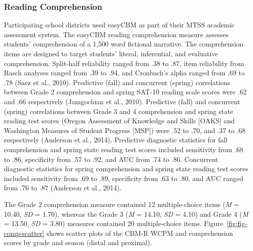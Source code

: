 \documentclass[
  english,
  man, fleqn, noextraspace]{apa6}
\begin{document}
\hypertarget{reading-comprehension}{%
\subsubsection{Reading Comprehension}\label{reading-comprehension}}

Participating school districts used easyCBM as part of their MTSS academic assessment system. The easyCBM reading comprehension measure assesses students' comprehension of a 1,500 word fictional narrative. The comprehension items are designed to target students' literal, inferential, and evaluative comprehension. Split-half reliability ranged from .38 to .87, item reliability from Rasch analyses ranged from .39 to .94, and Cronbach's alpha ranged from .69 to .78 (Saez et al., 2010). Predictive (fall) and concurrent (spring) correlations between Grade 2 comprehension and spring SAT-10 reading scale scores were .62 and .66 respectively (Jamgochian et al., 2010). Predictive (fall) and concurrent (spring) correlations between Grade 3 and 4 comprehension and spring state reading test scores (Oregon Assessment of Knowledge and Skills {[}OAKS{]} and Washington Measures of Student Progress {[}MSP{]}) were .52 to .70, and .37 to .68 respectively (Anderson et al., 2014). Predictive diagnostic statistics for fall comprehension and spring state reading test scores included sensitivity from .68 to .86, specificity from .57 to .92, and AUC from .74 to .86. Concurrent diagnostic statistics for spring comprehension and spring state reading test scores included sensitivity from .69 to .89, specificity from .63 to .80, and AUC ranged from .76 to .87 (Anderson et al., 2014).

The Grade 2 comprehension measure contained 12 multiple-choice items (\emph{M} = 10.40, \emph{SD} = 1.70), whereas the Grade 3 (\emph{M} = 14.10, \emph{SD} = 4.10) and Grade 4 (\emph{M} = 13.50, \emph{SD} = 3.80) measures contained 20 multiple-choice items. Figure~\ref{fig:fig-comp-scatter} shows scatter plots of the CBM-R WCPM and comprehension scores by grade and season (distal and proximal).
\end{document}
